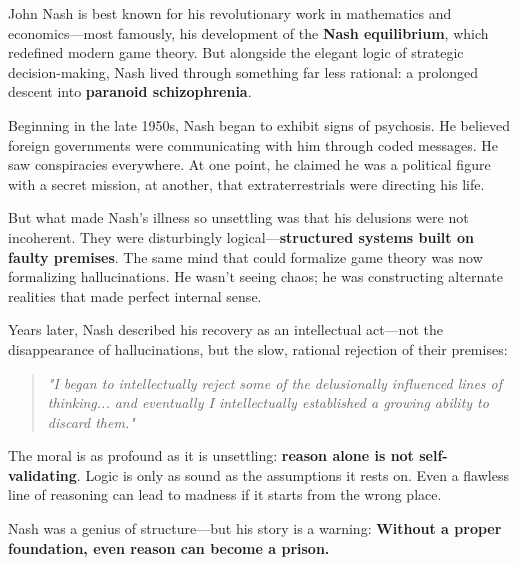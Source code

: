 \begin{tcolorbox}[title=Historical Sidebar: John Nash and the Logic of Delusion, colback=gray!5, colframe=black, fonttitle=\bfseries]

  John Nash is best known for his revolutionary work in mathematics and economics—most famously, his development of the \textbf{Nash equilibrium}, which redefined modern game theory. But alongside the elegant logic of strategic decision-making, Nash lived through something far less rational: a prolonged descent into \textbf{paranoid schizophrenia}.
  
  Beginning in the late 1950s, Nash began to exhibit signs of psychosis. He believed foreign governments were communicating with him through coded messages. He saw conspiracies everywhere. At one point, he claimed he was a political figure with a secret mission, at another, that extraterrestrials were directing his life. 
  
  But what made Nash’s illness so unsettling was that his delusions were not incoherent. They were disturbingly logical—\textbf{structured systems built on faulty premises}. The same mind that could formalize game theory was now formalizing hallucinations. He wasn’t seeing chaos; he was constructing alternate realities that made perfect internal sense.
  
  \medskip
  
  Years later, Nash described his recovery as an intellectual act—not the disappearance of hallucinations, but the slow, rational rejection of their premises:
  
  \begin{quote}
      \textit{"I began to intellectually reject some of the delusionally influenced lines of thinking... and eventually I intellectually established a growing ability to discard them."}
  \end{quote}
  
  \medskip
  
  The moral is as profound as it is unsettling: \textbf{reason alone is not self-validating}. Logic is only as sound as the assumptions it rests on. Even a flawless line of reasoning can lead to madness if it starts from the wrong place. 
  
  \medskip
  
  Nash was a genius of structure—but his story is a warning:  
  \textbf{Without a proper foundation, even reason can become a prison.}
  
\end{tcolorbox}



